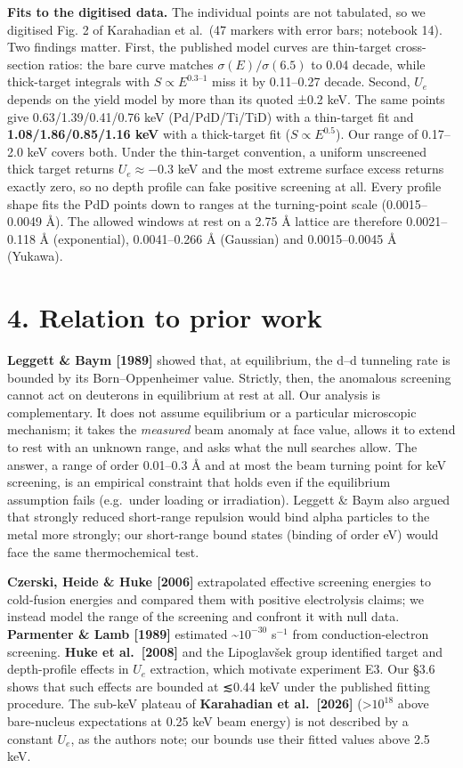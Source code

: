 \documentclass[
]{article}
\begin{document}
\textbf{Fits to the digitised data.} The individual points are not
tabulated, so we digitised Fig. 2 of Karahadian et al.~(47 markers with
error bars; notebook 14). Two findings matter. First, the published
model curves are thin-target cross-section ratios: the bare curve
matches \(\sigma(E)/\sigma(6.5)\) to 0.04 decade, while thick-target
integrals with \(S\propto E^{0.3\text{–}1}\) miss it by 0.11--0.27
decade. Second, \(U_e\) depends on the yield model by more than its
quoted ±0.2 keV. The same points give 0.63/1.39/0.41/0.76 keV
(Pd/PdD/Ti/TiD) with a thin-target fit and \textbf{1.08/1.86/0.85/1.16
keV} with a thick-target fit (\(S\propto E^{0.5}\)). Our range of
0.17--2.0 keV covers both. Under the thin-target convention, a uniform
unscreened thick target returns \(U_e \approx -0.3\) keV and the most
extreme surface excess returns exactly zero, so no depth profile can
fake positive screening at all. Every profile shape fits the PdD points
down to ranges at the turning-point scale (0.0015--0.0049 Å). The
allowed windows at rest on a 2.75 Å lattice are therefore 0.0021--0.118
Å (exponential), 0.0041--0.266 Å (Gaussian) and 0.0015--0.0045 Å
(Yukawa).

\hypertarget{relation-to-prior-work}{%
\section{4. Relation to prior work}\label{relation-to-prior-work}}

\textbf{Leggett \& Baym {[}1989{]}} showed that, at equilibrium, the
d--d tunneling rate is bounded by its Born--Oppenheimer value. Strictly,
then, the anomalous screening cannot act on deuterons in equilibrium at
rest at all. Our analysis is complementary. It does not assume
equilibrium or a particular microscopic mechanism; it takes the
\emph{measured} beam anomaly at face value, allows it to extend to rest
with an unknown range, and asks what the null searches allow. The
answer, a range of order 0.01--0.3 Å and at most the beam turning point
for keV screening, is an empirical constraint that holds even if the
equilibrium assumption fails (e.g.~under loading or irradiation).
Leggett \& Baym also argued that strongly reduced short-range repulsion
would bind alpha particles to the metal more strongly; our short-range
bound states (binding of order eV) would face the same thermochemical
test.

\textbf{Czerski, Heide \& Huke {[}2006{]}} extrapolated effective
screening energies to cold-fusion energies and compared them with
positive electrolysis claims; we instead model the range of the
screening and confront it with null data. \textbf{Parmenter \& Lamb
{[}1989{]}} estimated \textasciitilde{}\(10^{-30}\) s\(^{-1}\) from
conduction-electron screening. \textbf{Huke et al.~{[}2008{]}} and the
Lipoglavšek group identified target and depth-profile effects in \(U_e\)
extraction, which motivate experiment E3. Our §3.6 shows that such
effects are bounded at ≲0.44 keV under the published fitting procedure.
The sub-keV plateau of \textbf{Karahadian et al.~{[}2026{]}}
(\textgreater{}\(10^{18}\) above bare-nucleus expectations at 0.25 keV
beam energy) is not described by a constant \(U_e\), as the authors
note; our bounds use their fitted values above 2.5 keV.
\end{document}

